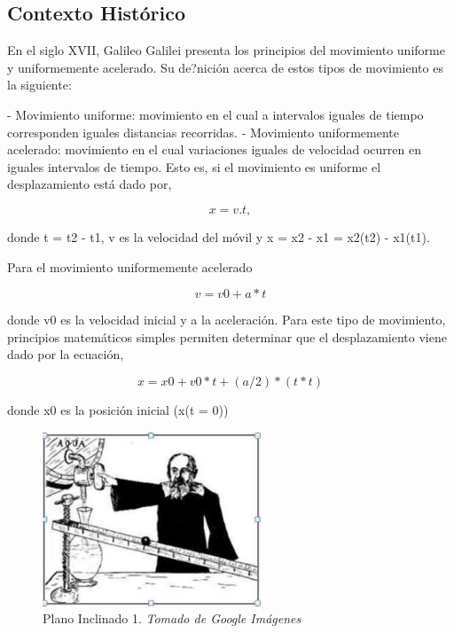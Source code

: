 \documentclass[journal]{IEEEtran}
\begin{document}
\subsection{Contexto Histórico}

En el siglo XVII, Galileo Galilei presenta los principios del movimiento uniforme y uniformemente acelerado. Su de?nición acerca de estos tipos de movimiento es la siguiente:

- Movimiento uniforme: movimiento en el cual a intervalos iguales de tiempo corresponden iguales distancias recorridas.
- Movimiento uniformemente acelerado: movimiento en el cual variaciones iguales de velocidad ocurren en iguales intervalos de tiempo. Esto es, si el movimiento es uniforme el desplazamiento está dado por,

\begin{equation}
    x = v . t, 
\end{equation}

donde t = t2 - t1, v es la velocidad del móvil y x = x2 - x1 = x2(t2) - x1(t1).

Para el movimiento uniformemente acelerado

\begin{equation}
    v = v0 + a * t
\end{equation}

donde v0 es la velocidad inicial y a la aceleración. Para este tipo de movimiento, principios matemáticos simples permiten determinar que el desplazamiento viene dado por la ecuación,

\begin{equation}
    x = x0 + v0 * t + (a / 2) * (t * t)
\end{equation}

donde x0 es la posición inicial (x(t = 0))

\begin{center}
  \begin{figure}[h!]
  \includegraphics[width=65mm]{plano_inclinado.jpg}
  \caption{Plano Inclinado 1. \emph{Tomado de Google Imágenes}}
  \end{figure}
\end{center}
\end{document}
